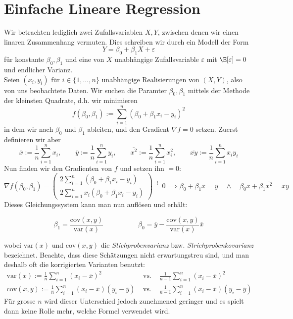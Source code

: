 \section{Einfache Lineare Regression}
Wir betrachten lediglich zwei Zufallsvariablen $X,Y$, zwischen denen wir einen linaren Zusammenhang vermuten. Dies schreiben wir durch ein Modell der Form
$$ Y = \beta_0 + \beta_1 X + \varepsilon$$
für konstante $\beta_0,\beta_1$ und eine von $X$ unabhängige Zufallsvariable $\varepsilon$ mit $\E[\varepsilon] = 0$ und endlicher Varianz.\\

Seien $(x_i, y_i)$ für $i \in \{1,\dots,n\}$ unabhängige Realisierungen von $(X,Y)$, also von uns beobachtete Daten. Wir suchen die Paramter $\beta_0,\beta_1$ mittels der Methode der kleinsten Quadrate, d.h. wir minimieren
$$ f(\beta_0, \beta_1) := \sum_{i=1}^n (\beta_0 + \beta_1 x_i - y_i)^2$$
in dem wir nach $\beta_0$ und $\beta_1$ ableiten, und den Gradient $\nabla f=0$ setzen. Zuerst definieren wir aber 
$$ \overline{x}:= \frac{1}{n}\sum_{i=1}^n x_i, \quad \quad \overline{y}:= \frac{1}{n}\sum_{i=1}^n y_i, \quad \quad \overline{x^2}:= \frac{1}{n}\sum_{i=1}^n x_i^2, \quad \quad \overline{xy}:= \frac{1}{n}\sum_{i=1}^n x_i y_i$$
Nun finden wir den Gradienten von $f$ und setzen ihn $=0$: 
$$ \nabla f(\beta_0, \beta_1) = \begin{pmatrix}
2 \sum_{i=1}^n (\beta_0 + \beta_1 x_i - y_i) \\ 
2 \sum_{i=1}^n x_i ( \beta_0 + \beta_1 x_i - y_i)
\end{pmatrix} \overset{!}{=} 0 \implies \beta_0 + \beta_1 \overline{x} = \overline{y} \quad \land \quad \beta_0 \overline{x}  + \beta_1 \overline{x^2} = \overline{xy}$$
Dieses Gleichungssystem kann man nun auflösen und erhält:
\begin{mdframed}[backgroundcolor=red!20]
$$ \beta_1 = \frac{\mathrm{cov}(x,y)}{\mathrm{var}(x)} \quad \quad \quad \quad \quad  \beta_0 = \overline{y} - \frac{\mathrm{cov}(x,y)}{\mathrm{var}(x)}\overline{x} $$
\end{mdframed}
wobei $\mathrm{var}(x)$ und $\mathrm{cov}(x,y)$ die \textit{Stichprobenvarianz} bzw. \textit{Strichprobenkovarianz} bezeichnet. Beachte, dass diese Schätzungen nicht erwartungstreu sind, und man deshalb oft die korrigierten Varianten benutzt:
\begin{eqnarray*}
\mathrm{var}(x) := \frac{1}{n}\sum_{i=1}^n (x_i - \overline{x})^2 & \mbox{ vs. } & \frac{1}{n-1} \sum_{i=1}^n (x_i - \overline{x})^2 \\
\mathrm{cov}(x,y) := \frac{1}{n} \sum_{i=1}^n (x_i - \overline{x})(y_i - \overline{y}) & \mbox{ vs. } & \frac{1}{n-1} \sum_{i=1}^n (x_i - \overline{x})(y_i - \overline{y})
\end{eqnarray*}
Für grosse $n$ wird dieser Unterschied jedoch zunehmened geringer und es spielt dann keine Rolle mehr, welche Formel verwendet wird.
